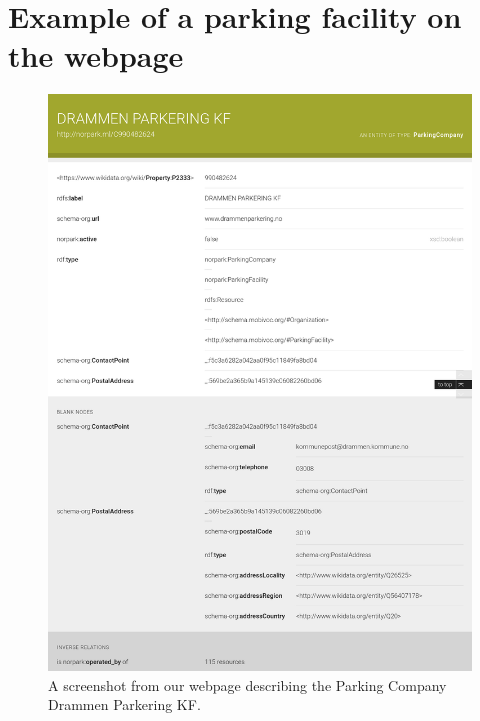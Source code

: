 \chapter{Example of a parking facility on the webpage}
\label{appendix:webpage}
\begin{figure}[H]
	\centering
	\includegraphics[scale=0.22]{figures/parking-company-screenshot.png}
	\caption{A screenshot from our webpage describing the Parking Company Drammen Parkering KF.}
\end{figure}

